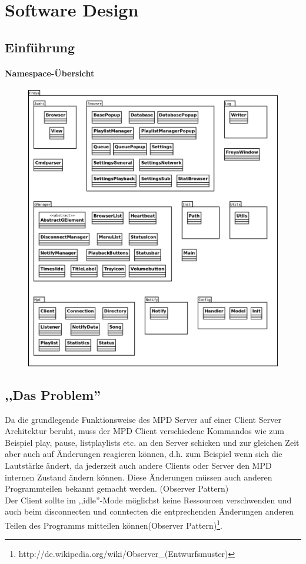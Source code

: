 
\chapter{Software Design}

\section{Einführung}

\subsubsection{Namespace-Übersicht}
\begin{figure}[h]
    \centering
    \includegraphics[scale=0.3]{Namespace_Uebersicht.png}
\end{figure}

\section{,,Das Problem''}

Da die grundlegende Funktionsweise des MPD Server auf einer Client Server Architektur beruht, muss der MPD Client
verschiedene Kommandos wie zum Beispiel play, pause, listplaylists etc. an den Server schicken
und zur gleichen Zeit aber auch auf Änderungen reagieren können, d.h. zum Beispiel wenn sich die Lautstärke ändert,
da jederzeit auch andere Clients oder Server den MPD internen Zustand ändern können.
Diese Änderungen müssen auch anderen Programmteilen bekannt gemacht werden. (Observer Pattern)
\\
Der Client sollte im ,,idle''-Mode möglichst keine Ressourcen verschwenden und auch beim 
disconnecten und conntecten die entprechenden Änderungen anderen Teilen des Programms mitteilen
können(Observer Pattern)\footnote{http://de.wikipedia.org/wiki/Observer\_(Entwurfsmuster)}. 
\\

